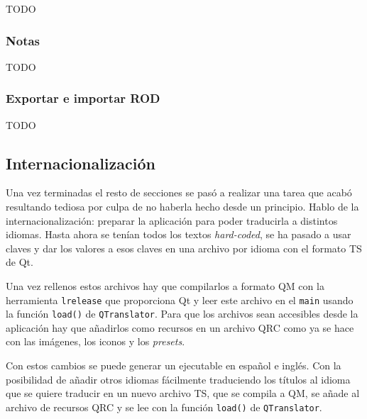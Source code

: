 TODO

\subsubsection{Notas}

TODO

\subsubsection{Exportar e importar ROD}

TODO

\subsection{Internacionalización}

Una vez terminadas el resto de secciones se pasó a realizar una tarea que acabó resultando tediosa por culpa de no haberla hecho desde un principio. Hablo de la internacionalización: preparar la aplicación para poder traducirla a distintos idiomas. Hasta ahora se tenían todos los textos \textit{hard-coded}, se ha pasado a usar claves y dar los valores a esos claves en una archivo por idioma con el formato TS de Qt.

Una vez rellenos estos archivos hay que compilarlos a formato QM con la herramienta \texttt{lrelease} que proporciona Qt y leer este archivo en el \texttt{main} usando la función \texttt{load()} de \texttt{QTranslator}. Para que los archivos sean accesibles desde la aplicación hay que añadirlos como recursos en un archivo QRC como ya se hace con las imágenes, los iconos y los \textit{presets}.

Con estos cambios se puede generar un ejecutable en español e inglés. Con la posibilidad de añadir otros idiomas fácilmente traduciendo los títulos al idioma que se quiere traducir en un nuevo archivo TS, que se compila a QM, se añade al archivo de recursos QRC y se lee con la función \texttt{load()} de \texttt{QTranslator}.